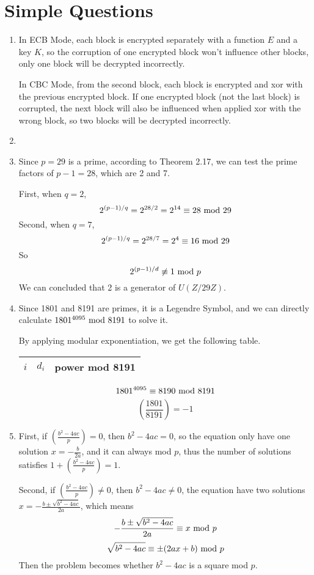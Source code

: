 \documentclass{article}
\renewcommand{\mod}{{\rm\ mod\ }}
\begin{document}
\section{Simple Questions}
\begin{enumerate}
\item
In ECB Mode, each block is encrypted separately with a function $E$ and a key $K$, so the corruption of one encrypted block won't influence other blocks, only one block will be decrypted incorrectly.

In CBC Mode, from the second block, each block is encrypted and xor with the previous encrypted block. If one encrypted block (not the last block) is corrupted, the next block will also be influenced when applied xor with the wrong block, so two blocks will be decrypted incorrectly.

\item



\item
Since $p=29$ is a prime, according to Theorem 2.17, we can test the prime factors of $p-1=28$, which are 2 and 7. 

First, when $q=2$, $$2^{(p-1)/q}=2^{28/2}=2^{14}\equiv28\mod 29$$
Second, when $q=7$, $$2^{(p-1)/q}=2^{28/7}=2^{4}\equiv16\mod 29$$
So $$2^{(p-1)/d}\not\equiv1\mod p$$
We can concluded that 2 is a generator of $U(Z/29Z)$.

\item
Since 1801 and 8191 are primes, it is a Legendre Symbol, and we can directly calculate $1801^{4095}\mod8191$ to solve it.

By applying modular exponentiation, we get the following table.
\begin{center}
\begin{tabular}{ccc}
$i$ & $d_i$ & power mod 8191 \\\hline

\end{tabular}
\end{center}
$$1801^{4095}\equiv8190\mod8191$$
$$\left(\frac{1801}{8191}\right)=-1$$

\item
First, if $\left(\frac{b^2-4ac}{p}\right)=0$, then $b^2-4ac=0$, so the equation only have one solution $x=-\frac{b}{2a}$, and it can always mod $p$, thus the number of solutions satisfies $1+\left(\frac{b^2-4ac}{p}\right)=1$.

Second, if $\left(\frac{b^2-4ac}{p}\right)\neq0$, then $b^2-4ac\neq0$, the equation have two solutions $x=-\frac{b\pm\sqrt{b^2-4ac}}{2a}$, which means
$$-\frac{b\pm\sqrt{b^2-4ac}}{2a}\equiv x\mod p$$
$$\sqrt{b^2-4ac}\equiv \pm(2ax+b)\mod p$$
Then the problem becomes whether $b^2-4ac$ is a square mod $p$.


\end{enumerate}
\end{document}
